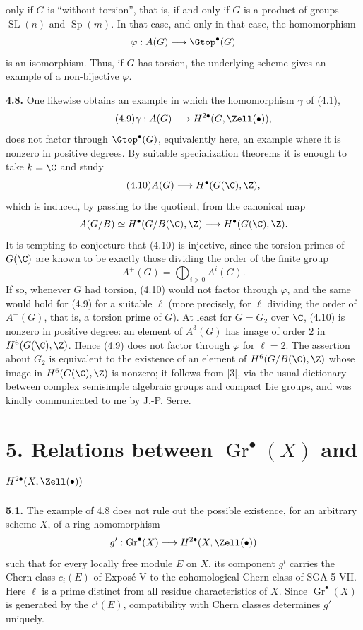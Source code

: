 only if $G$ is ``without torsion'', that is, if and only if $G$ is a
product of groups $\operatorname{SL}(n)$ and $\operatorname{Sp}(m)$. In
that case, and only in that case, the homomorphism
\[
 \varphi:A(G)\longrightarrow\Gtop^\bullet(G)
\]
is an isomorphism. Thus, if $G$ has torsion, the underlying scheme gives an
example of a non-bijective $\varphi$.

\textbf{4.8.} One likewise obtains an example in which the homomorphism
$\gamma$ of (4.1),
\begin{equation}\tag{4.9}
 \gamma:A(G)\longrightarrow H^{2\bullet}(G,\Zell(\bullet)),
\end{equation}
does not factor through $\Gtop^\bullet(G)$, equivalently here, an example
where it is nonzero in positive degrees. By suitable specialization
theorems it is enough to take $k=\C$ and study
\begin{equation}\tag{4.10}
 A(G)\longrightarrow H^\bullet(G(\C),\Z),
\end{equation}
which is induced, by passing to the quotient, from the canonical map
\[
 A(G/B)\simeq H^\bullet(G/B(\C),\Z)
   \longrightarrow H^\bullet(G(\C),\Z).
\]
It is tempting to conjecture that (4.10) is injective, since the torsion
primes of $G(\C)$ are known to be exactly those dividing the order of the
finite group
\[
 A^+(G)=\bigoplus_{i>0}A^i(G).
\]
If so, whenever $G$ had torsion, (4.10) would not factor through
$\varphi$, and the same would hold for (4.9) for a suitable $\ell$ (more
precisely, for $\ell$ dividing the order of $A^+(G)$, that is, a torsion
prime of $G$). At least for $G=G_2$ over $\C$, (4.10) is nonzero in
positive degree: an element of $A^3(G)$ has image of order $2$ in
$H^6(G(\C),\Z)$. Hence (4.9) does not factor through $\varphi$ for
$\ell=2$. The assertion about $G_2$ is equivalent to the existence of an
element of $H^6(G/B(\C),\Z)$ whose image in $H^6(G(\C),\Z)$ is nonzero;
it follows from [3], via the usual dictionary between complex semisimple
algebraic groups and compact Lie groups, and was kindly communicated to me
by J.-P. Serre.

\section*{5. Relations between $\operatorname{Gr}^\bullet(X)$ and
$H^{2\bullet}(X,\Zell(\bullet))$}

\textbf{5.1.} The example of 4.8 does not rule out the possible existence,
for an arbitrary scheme $X$, of a ring homomorphism
\[
 g':\operatorname{Gr}^\bullet(X)
   \longrightarrow H^{2\bullet}(X,\Zell(\bullet))
\]
such that for every locally free module $E$ on $X$, its component $g^i$
carries the Chern class $c_i(E)$ of Exposé V to the cohomological Chern
class of SGA 5 VII. Here $\ell$ is a prime distinct from all residue
characteristics of $X$. Since $\operatorname{Gr}^\bullet(X)$ is generated
by the $c^i(E)$, compatibility with Chern classes determines $g'$
uniquely.

